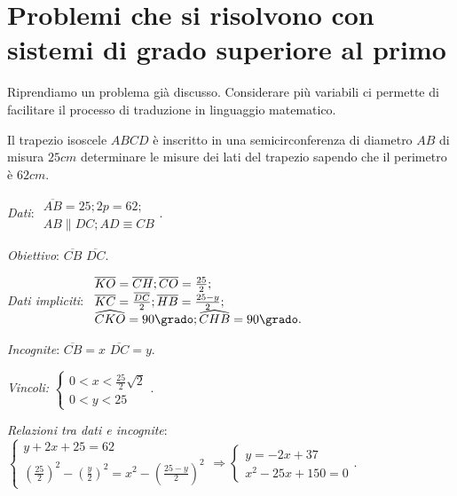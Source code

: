 \section{Problemi che si risolvono con sistemi di grado superiore al primo}
Riprendiamo un problema già discusso. Considerare più variabili ci permette di facilitare il processo di traduzione in linguaggio matematico.

\begin{problema}
Il trapezio isoscele \({ABCD}\) è inscritto in una semicirconferenza di diametro \({AB}\) di misura \(25\unit{cm}\) determinare le misure dei lati del trapezio sapendo che il perimetro è \(62\unit{cm}\).
\end{problema}
\begin{multicols}{2}
\emph{Dati}: \(\begin{array}{l}\overline{AB}=25;2p=62;\\{AB}\parallel {DC};{AD}\equiv {CB}\end{array}\).

\emph{Obiettivo}: \(\overline{CB}\) \(\overline{DC}\).

\emph{Dati impliciti}: \(\begin{array}{l}
\overline{{KO}}=\overline{{CH}}; \overline{{CO}}=\frac{25} 2;\\ \overline{{KC}}=\frac{\overline{{DC}}} 2; \overline{{HB}}=\frac{25-y} 2;\\ \widehat {{CKO}}=90\grado; \widehat {{CHB}}=90\grado.\end{array}\)

\emph{Incognite}: \(\overline{{CB}}=x\) \(\overline{{DC}}=y\).

\emph{Vincoli: } \(\left\{\begin{array}{l}0<x<\frac{25} 2\sqrt 2\\0<y<25 \end{array}\right.\).
\begin{center}

\end{center}
\end{multicols}

\emph{Relazioni tra dati e incognite}:
\( \left\{\begin{array}{l}{y+2x+25=62}\\{\left(\frac{25} 2\right)^2-\left(\frac y 2\right)^2=x^2-\left(\frac{25-y} 2\right)^2}\end{array}\right. \Rightarrow \left\{\begin{array}{l}{y=-2x+37}\\{x^2-25x+150=0}\end{array}\right.. \)

